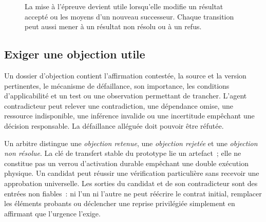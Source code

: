 \documentclass[11pt,a4paper]{article}
\begin{document}
\begin{figure}[h!]
\centering
{}
\caption{La mise à l’épreuve devient utile lorsqu’elle modifie un résultat accepté ou les moyens d’un nouveau successeur. Chaque transition peut aussi mener à un résultat non résolu ou à un refus.}
\end{figure}

\subsection{Exiger une objection utile}
Un dossier d’objection contient l’affirmation contestée, la source et la version pertinentes, le mécanisme de défaillance, son importance, les conditions d’applicabilité et un test ou une observation permettant de trancher. L’agent contradicteur peut relever une contradiction, une dépendance omise, une ressource indisponible, une inférence invalide ou une incertitude empêchant une décision responsable. La défaillance alléguée doit pouvoir être réfutée.

Un arbitre distingue une \emph{objection retenue}, une \emph{objection rejetée} et une \emph{objection non résolue}. La clé de transfert stable du prototype lie un artefact~; elle ne constitue pas un verrou d’activation durable empêchant une double exécution physique. Un candidat peut réussir une vérification particulière sans recevoir une approbation universelle. Les sorties du candidat et de son contradicteur sont des entrées non fiables~: ni l’un ni l’autre ne peut réécrire le contrat initial, remplacer les éléments probants ou déclencher une reprise privilégiée simplement en affirmant que l’urgence l’exige.
\end{document}
